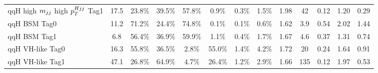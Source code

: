 \begin{tabular}{l|cccccccc|c|ccc}
     qqH high $m_{jj}$ high $p_T^{Hjj}$ Tag1 & 17.5 & 23.8\% & 39.5\% & 57.8\% & 0.9\% & 0.3\% & 1.5\% & 1.98 & 42 & 0.12 & 1.20 & 0.29 \\
     [\cmsTabSkip]
     qqH BSM Tag0 & 11.2 & 71.2\% & 24.4\% & 74.8\% & 0.1\% & 0.1\% & 0.6\% & 1.62 & 3.9 & 0.54 & 2.02 & 1.44 \\
     qqH BSM Tag1 & 6.8 & 56.4\% & 36.9\% & 59.9\% & 1.1\% & 0.4\% & 1.7\% & 1.67 & 4.6 & 0.37 & 1.31 & 0.74 \\
     [\cmsTabSkip]
     qqH VH-like Tag0 & 16.3 & 55.8\% & 36.5\% & 2.8\% & 55.0\% & 1.4\% & 4.2\% & 1.72 & 20 & 0.24 & 1.64 & 0.91 \\
     qqH VH-like Tag1 & 47.1 & 26.8\% & 64.9\% & 4.7\% & 26.4\% & 1.2\% & 2.9\% & 1.66 & 135 & 0.12 & 1.97 & 0.53 \\
     \hline
\end{tabular}
